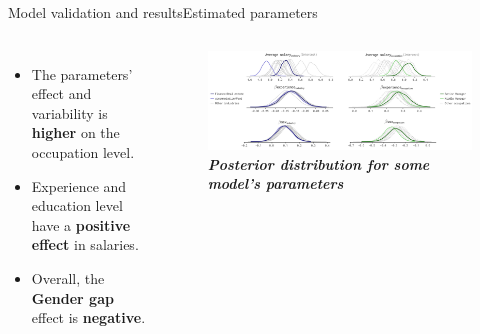 \documentclass[aspectratio=169, xcolor=dvipsnames]{beamer}
\begin{document}
\begin{frame}{Model validation and results}{Estimated parameters}
    \vspace*{-20pt}
    \begin{columns}
        \begin{itemize}
            \item \fontsize{8pt}{12pt}\selectfont The parameters' effect and variability is \textbf{higher} on the occupation level.
            \item \fontsize{8pt}{12pt}\selectfont Experience and education level have a \textbf{positive effect} in salaries.
            \item \fontsize{8pt}{12pt}\selectfont Overall, the \textbf{Gender gap} effect is \textbf{negative}.
        \end{itemize}
            \begin{figure}
                \centering
                \includegraphics[width=1.05\textwidth]{./images/trace_1.png}
                \captionsetup{labelformat=empty}
                \setlength{\abovecaptionskip}{-10pt}
                \caption{\fontsize{8pt}{8pt}\selectfont \textbf{\textit{Posterior distribution for some model's parameters}}}
            \end{figure}
    \end{columns}
\end{frame}
\end{document}
